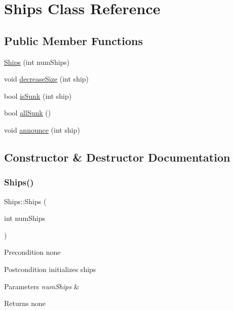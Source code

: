 \hypertarget{classShips}{}\section{Ships Class Reference}
\label{classShips}
\subsection*{Public Member Functions}
\begin{DoxyCompactItemize}
\item 
\hyperlink{classShips_aabbca77f901e307950267b22383be013}{Ships} (int num\+Ships)
\item 
void \hyperlink{classShips_ad77281b5c68f9fcc7583c6766f2aac3f}{decrease\+Size} (int ship)
\item 
bool \hyperlink{classShips_a06a243e4251ffef7461eefff4d69e512}{is\+Sunk} (int ship)
\item 
bool \hyperlink{classShips_a401ed503f23bb11e6707a687ad831b62}{all\+Sunk} ()
\item 
void \hyperlink{classShips_aaf0177a1d238c8d6f169c1476072e440}{announce} (int ship)
\end{DoxyCompactItemize}


\subsection{Constructor \& Destructor Documentation}
\mbox{\label{classShips_aabbca77f901e307950267b22383be013}} 
\subsubsection{\texorpdfstring{Ships()}{Ships()}}
{\footnotesize\ttfamily Ships\+::\+Ships (\begin{DoxyParamCaption}\item[{int}]{num\+Ships }\end{DoxyParamCaption})}

\begin{DoxyPrecond}{Precondition}
none 
\end{DoxyPrecond}
\begin{DoxyPostcond}{Postcondition}
initializes ships 
\end{DoxyPostcond}

\begin{DoxyParams}{Parameters}
{\em num\+Ships} & \\
\hline
\end{DoxyParams}
\begin{DoxyReturn}{Returns}
none 
\end{DoxyReturn}


